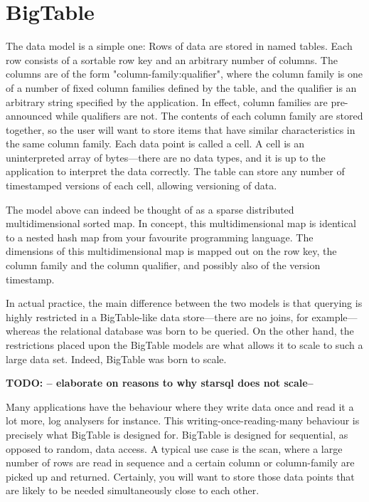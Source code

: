 \documentclass[a4paper,10pt]{book}
\begin{document}
\section{BigTable}

The data model is a simple one: Rows of data are stored in named tables.
Each row consists of a sortable row key and an arbitrary number of columns.
The columns are of the form "column-family:qualifier", where the column
family is one of a number of fixed column families defined by the table,
and the qualifier is an arbitrary string specified by the application. In
effect, column families are pre-announced while qualifiers are not. The
contents of each column family are stored together, so the user will want
to store items that have similar characteristics in the same column family.
Each data point is called a cell. A cell is an uninterpreted array of
bytes---there are no data types, and it is up to the application to
interpret the data correctly. The table can store any number of timestamped
versions of each cell, allowing versioning of data.

The model above can indeed be thought of as a sparse distributed
multidimensional sorted map. In concept, this multidimensional map is
identical to a nested hash map from your favourite programming language. The
dimensions of this multidimensional map is mapped out on the row key, the
column family and the column qualifier, and possibly also of the version
timestamp.

In actual practice, the main difference between the two models is that
querying is highly restricted in a BigTable-like data store---there are no
joins, for example---whereas the relational database was born to be queried.
On the other hand, the restrictions placed upon the BigTable models are
what allows it to scale to such a large data set. Indeed, BigTable was born
to scale.

\textbf{TODO: -- elaborate on reasons to why starsql does not scale--}

Many applications have the behaviour where they write data once and read it
a lot more, log analysers for instance. This writing-once-reading-many
behaviour is precisely what BigTable is designed for. BigTable is designed
for sequential, as opposed to random, data access. A typical use case is
the scan, where a large number of rows are read in sequence and a certain
column or column-family are picked up and returned. Certainly, you will
want to store those data points that are likely to be needed simultaneously
close to each other. \cite{bigtable}
\end{document}
